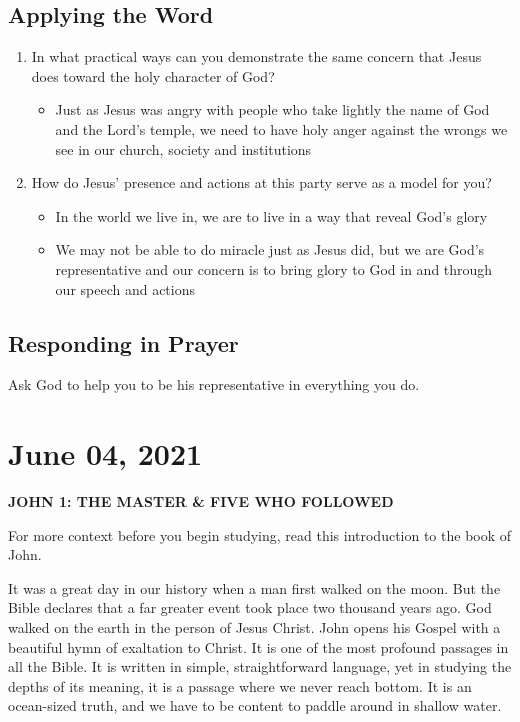 \documentclass[11pt]{article}
\begin{document}
\subsection{Applying the Word}
\label{sec:orgcafe263}

\begin{enumerate}
\item In what practical ways can you demonstrate the same concern that Jesus does
toward the holy character of God?
\begin{itemize}
\item Just as Jesus was angry with people who take lightly the name of God and the
Lord's temple, we need to have holy anger against the wrongs we see in our
church, society and institutions
\end{itemize}

\item How do Jesus’ presence and actions at this party serve as a model for you?
\begin{itemize}
\item In the world we live in, we are to live in a way that reveal God's glory

\item We may not be able to do miracle just as Jesus did, but we are God's
representative and our concern is to bring glory to God in and through our
speech and actions
\end{itemize}
\end{enumerate}

\subsection{Responding in Prayer}
\label{sec:org4acfaef}

Ask God to help you to be his representative in everything you do.

\section{June 04, 2021}
\label{sec:org6d071ac}

\textbf{\textbf{JOHN 1: THE MASTER \& FIVE WHO FOLLOWED}}

For more context before you begin studying, read this introduction to the book of John. 

It was a great day in our history when a man first walked on the moon. But the Bible declares that a far greater event took place two thousand years ago. God walked on the earth in the person of Jesus Christ. John opens his Gospel with a beautiful hymn of exaltation to Christ. It is one of the most profound passages in all the Bible. It is written in simple, straightforward language, yet in studying the depths of its meaning, it is a passage where we never reach bottom. It is an ocean-sized truth, and we have to be content to paddle around in shallow water.
\end{document}
